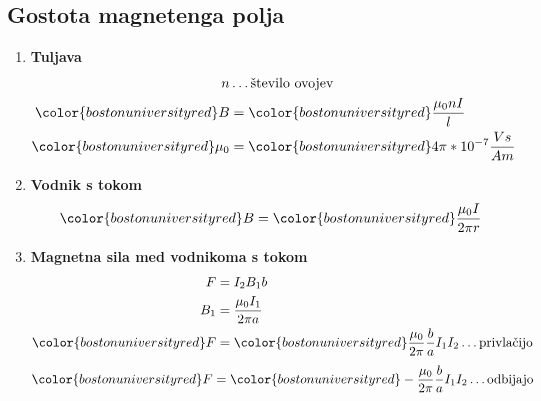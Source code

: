 {\color{indiagreen}\subsection{Gostota magnetenga polja}}
\begin{enumerate}
	\item \textbf{Tuljava}\\
		\begin{align*}
			n &\dots \text{število ovojev}\\
			{\color{bostonuniversityred}B} &= {\color{bostonuniversityred}\frac{\mu_0 nI}{l}}\\
			{\color{bostonuniversityred}\mu_0} &= {\color{bostonuniversityred}4\pi * 10^{-7}\frac{Vs}{Am}}\\
		\end{align*}
	\item \textbf{Vodnik s tokom}\\
		\begin{align*}
			{\color{bostonuniversityred}B} &= {\color{bostonuniversityred}\frac{\mu_0 I}{2\pi r}}\\
		\end{align*}
	\item \textbf{Magnetna sila med vodnikoma s tokom}\\
		\begin{align*}
			F &= I_2 B_1 b\\
			B_1 &= \frac{\mu_0 I_1}{2\pi a}\\
			{\color{bostonuniversityred}F} &= {\color{bostonuniversityred}\frac{\mu_0}{2\pi}\frac{b}{a}I_1I_2} \dots \text{privlačijo}\\
		\end{align*}
		\begin{align*}
			{\color{bostonuniversityred}F} &= {\color{bostonuniversityred}-\frac{\mu_0}{2\pi}\frac{b}{a}I_1I_2} \dots \text{odbijajo}\\
		\end{align*}
\end{enumerate}
